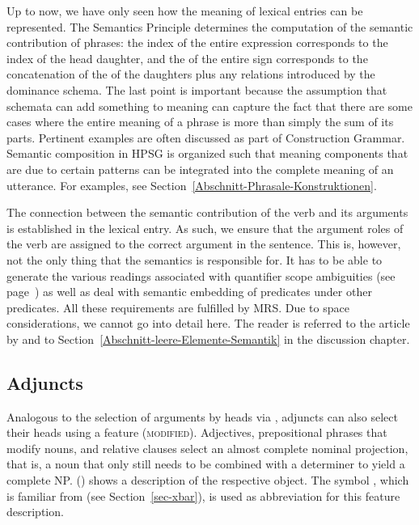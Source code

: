 \addlines 
Up to now, we have only seen how the meaning of lexical entries can be represented. The
Semantics Principle determines the computation of the semantic contribution
of phrases: the index of the entire expression corresponds to the index of the head daughter, and
the \relsv of the entire sign corresponds to the concatenation of the \relsvs of the daughters plus
any relations introduced by the dominance schema. The last point is important because the assumption
that schemata can add something to meaning can capture the fact that there are some cases where the
entire meaning of a phrase is more than simply the sum of its parts. Pertinent
examples are often discussed as part of Construction Grammar\indexcxg. Semantic composition in HPSG
is organized such that meaning components that are due to certain patterns can be integrated into
the complete meaning of an utterance. For examples, see
Section~\ref{Abschnitt-Phrasale-Konstruktionen}.

The connection between the semantic contribution of the verb and its arguments is established in the
lexical entry.  As such, we ensure that the argument roles of the verb are assigned to the correct
argument in the sentence. This is, however, not the only thing that the semantics is responsible
for. It has to be able to generate the various readings associated with quantifier scope ambiguities
(see page~\pageref{Beispiel-Every-man-loves-a-woman}) as well as deal with semantic embedding of
predicates under other predicates. All these requirements are fulfilled by MRS. Due to space
considerations, we cannot go into detail here. The reader is referred to the article by
\citet*{CFPS2005a} and to Section~\ref{Abschnitt-leere-Elemente-Semantik} in the discussion chapter.



\subsection{Adjuncts}
\label{Abschnitt-HPSG-Adjunkte}\label{sec-adjuncts-hpsg}

Analogous to the selection of arguments by heads via \comps, adjuncts can also select their heads using a feature (\textsc{modified}).
Adjectives, prepositional phrases that modify nouns, and relative clauses select an almost complete nominal projection, that is, a noun that only still needs to
be combined with a determiner to yield a complete NP. () shows a description of the respective 
object. The symbol \nbar, which is familiar from \xbart (see Section~\ref{sec-xbar}), is used as abbreviation
for this feature description.

